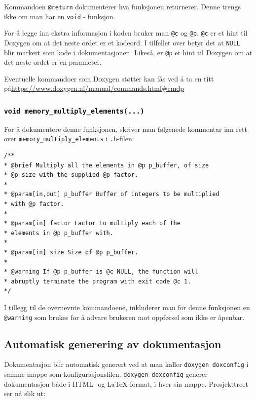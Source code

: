 \begin{alphasection}
Kommandoen \verb|@return| dokumenterer hva funksjonen returnerer. Denne trengs ikke om man har en \lstinline{void} - funksjon.

For å legge inn ekstra informasjon i koden bruker man \verb|@c| og \verb|@p|. \verb|@c| er et hint til Doxygen om at det neste ordet er et kodeord. I tilfellet over betyr det at \verb|NULL| blir markert som kode i dokumentasjonen. Likeså, er \verb|@p| et hint til Doxygen om at det neste ordet er en parameter.

Eventuelle kommandoer som Doxygen støtter kan fås ved å ta en titt på\newline \href{https://www.doxygen.nl/manual/commands.html#cmdp}{https://www.doxygen.nl/manual/commands.html\#cmdp}

\cprotect\subsubsection{\lstinline{void memory_multiply_elements(...)}}

For å dokumentere denne funksjonen, skriver man følgenede kommentar inn rett over \verb|memory_multiply_elements| i \verb|.h|-filen:


\begin{lstlisting}
/**
* @brief Multiply all the elements in @p p_buffer, of size
* @p size with the supplied @p factor.
*
* @param[in,out] p_buffer Buffer of integers to be multiplied
* with @p factor.
*
* @param[in] factor Factor to multiply each of the
* elements in @p p_buffer with.
*
* @param[in] size Size of @p p_buffer.
*
* @warning If @p p_buffer is @c NULL, the function will
* abruptly terminate the program with exit code @c 1.
*/
\end{lstlisting}


I tillegg til de overnevnte kommandoene, inkluderer man for denne funksjonen en \verb|@warning| som brukes for å advare brukeren mot oppførsel som ikke er åpenbar. 

\subsection{Automatisk generering av dokumentasjon}  

Dokumentasjon blir automatisk generert ved at man kaller \verb|doxygen doxconfig| i samme mappe som konfigurasjonsfilen. \verb|doxygen doxconfig| generer dokumentasjon både i HTML- og \LaTeX-format, i hver sin mappe. Prosjekttreet ser nå slik ut:


\end{alphasection}
